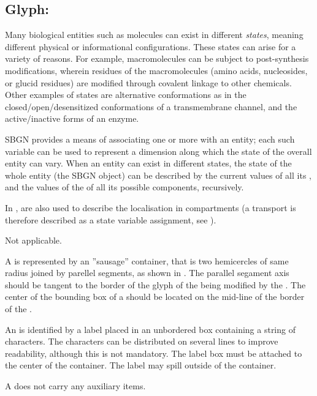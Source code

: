 
\color{blue}

\subsection{Glyph: }
\label{sec:stateVariable}

Many biological entities such as molecules can exist in different \emph{states}, meaning different physical or informational configurations.  These states can arise for a variety of reasons.  For example, macromolecules can be subject to post-synthesis modifications, wherein residues of the macromolecules (amino acids, nucleosides, or glucid residues) are modified through covalent linkage to other chemicals.  Other examples of states are alternative conformations as in the closed/open/desensitized conformations of a transmembrane channel, and the active/inactive forms of an enzyme.

SBGN provides a means of associating one or more  with an entity; each such variable can be used to represent a dimension along which the state of the overall entity can vary.  When an entity can exist in different states, the state of the whole entity (\ie the SBGN object) can be described by the current values of all its , and the values of the  of all its possible components, recursively.

In \SBGNERLone,  are also used to describe the localisation in compartments (a transport is therefore described as a state variable assignment, see ).

\begin{glyphDescription}

\glyphSboTerm Not applicable.

\glyphContainer A  is represented by an ''sausage'' container, that is two hemicercles of same radius joined by parellel segments, as shown in .  The parallel segament axis should be tangent to the border of the glyph of the  being modified by the . The center of the bounding box of a  should be located on the mid-line of the border of the .

\glyphLabel An  is identified by a label placed in an unbordered box containing a string of characters.  The characters can be distributed on several lines to improve readability, although this is not mandatory.  The label box must be attached to the center of the container.  The label may spill outside of the container.

\glyphAux A  does not carry any auxiliary items.  

\end{glyphDescription}

